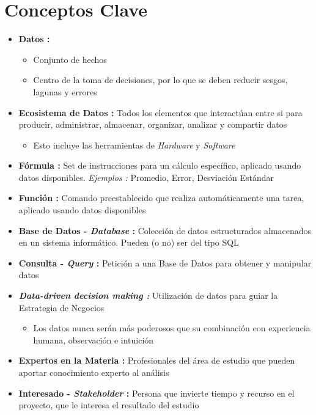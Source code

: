 \section{Conceptos Clave}
\begin{itemize}
    \item {\textbf{Datos : }
    \begin{itemize}
        \item {Conjunto de hechos}
        \item {Centro de la toma de decisiones, por lo que se deben reducir sesgos, lagunas y errores}
    \end{itemize}}
    \item {\textbf{Ecosistema de Datos : }Todos los elementos que interactúan entre si para producir, administrar, almacenar, organizar, analizar y compartir datos
    \begin{itemize}
        \item {Esto incluye las herramientas de \textit{Hardware} y \textit{Software}}
    \end{itemize}}
    \item {\textbf{Fórmula : }Set de instrucciones para un cálculo específico, aplicado usando datos disponibles. \textit{Ejemplos : }Promedio, Error, Desviación Estándar}
    \item {\textbf{Función : }Comando preestablecido que realiza automáticamente una tarea, aplicado usando datos disponibles}
    \item {\textbf{Base de Datos - \textit{Database} : }Colección de datos estructurados almacenados en un sistema informático. Pueden (o no) ser del tipo SQL}
    \item {\textbf{Consulta - \textit{Query} : }Petición a una Base de Datos para obtener y manipular datos}
    \item {\textbf{\textit{Data-driven decision making : }}Utilización de datos para guiar la Estrategia de Negocios 
    \begin{itemize}
        \item {Los datos nunca serán más poderosos que su combinación con experiencia humana, observación e intuición}
    \end{itemize}}
    \item {\textbf{Expertos en la Materia : }Profesionales del área de estudio que pueden aportar conocimiento experto al análisis}
    \item {\textbf{Interesado - \textit{Stakeholder} : }Persona que invierte tiempo y recurso en el proyecto, que le interesa el resultado del estudio}

\end{itemize}
